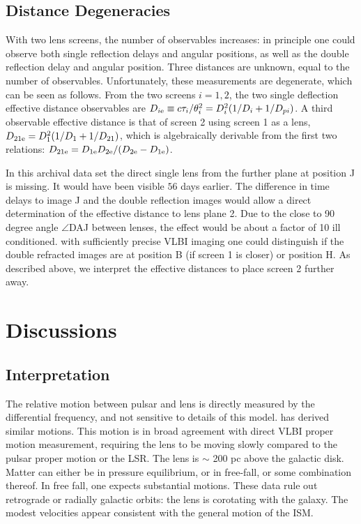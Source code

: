 \documentclass[useAMS,usenatbib]{mn2e}
\begin{document}
\subsection{Distance Degeneracies}
\label{sec:degeneracy}
With two lens screens, the number of observables increases: in
principle one could observe both single reflection delays and angular
positions, as well as the double reflection delay and angular
position.  Three distances are unknown, equal to the number of
observables.  Unfortunately, these measurements are degenerate, which
can be seen as follows. From the two screens $i=1,2$, the two single
deflection effective distance observables are
$D_{i{\rm e}} \equiv c\tau_i/\theta_i^2=D_i^2(1/D_i+1/D_{pi})$.  A third
observable effective distance is that of screen 2 using screen 1 as a
lens, $D_{21{\rm e}}=D_1^2(1/D_1+1/D_{21})$, which is algebraically
derivable from the first two relations:
$D_{{21}{\rm e}}=D_{1{\rm e}}D_{2{\rm e}}/(D_{2{\rm e}}-D_{1{\rm e}})$.  


In this archival data set the direct single lens from the further
plane at position J is missing.  It would have been visible $56$ days
earlier. The difference in time delays to image J and the double
reflection images would allow a direct determination of the effective
distance to lens plane 2.  Due to the close to 90 degree angle $\angle$DAJ
between lenses, the effect would be about a factor of 10 ill
conditioned.  with sufficiently precise VLBI imaging one could
distinguish if the double refracted images are at position B (if
screen 1 is closer) or position H.  As described above, we interpret
the effective distances to place screen 2 further away.

\section{Discussions}

\subsection{Interpretation}

The relative motion between pulsar and lens is directly measured by
the differential frequency, and not sensitive to details of this
model.  \citet{2010ApJ...708..232B} has derived similar motions.  This
motion is in broad agreement with direct VLBI proper motion
measurement, requiring the lens to be moving slowly compared to the
pulsar proper motion or the LSR.  The lens is $\sim$ 200 pc above the
galactic disk.  Matter can either be in pressure equilibrium, or in
free-fall, or some combination thereof.  In free fall, one expects
substantial motions.  These data rule out retrograde or radially
galactic orbits: the lens is corotating with the galaxy.  The modest
velocities appear consistent with the general motion of the ISM.
\end{document}

